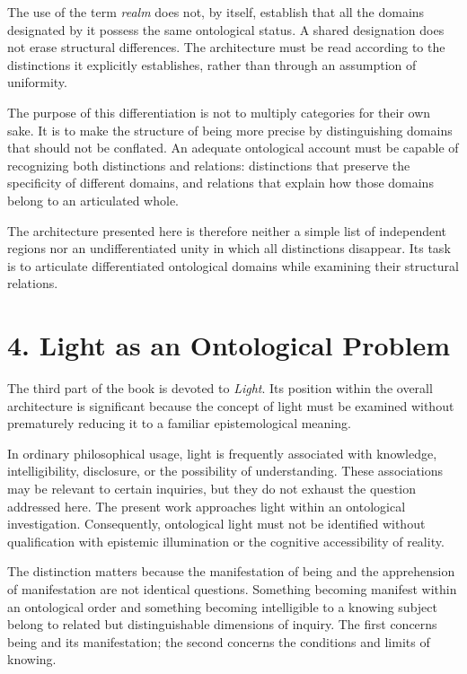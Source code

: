 The use of the term \textit{realm} does not, by itself,
establish that all the domains designated by it possess
the same ontological status. A shared designation does
not erase structural differences. The architecture must
be read according to the distinctions it explicitly
establishes, rather than through an assumption of uniformity.

The purpose of this differentiation is not to multiply
categories for their own sake. It is to make the structure
of being more precise by distinguishing domains that
should not be conflated. An adequate ontological account
must be capable of recognizing both distinctions and
relations: distinctions that preserve the specificity of
different domains, and relations that explain how those
domains belong to an articulated whole.

The architecture presented here is therefore neither a
simple list of independent regions nor an undifferentiated
unity in which all distinctions disappear. Its task is
to articulate differentiated ontological domains while
examining their structural relations.


\section*{4. Light as an Ontological Problem}

The third part of the book is devoted to \textit{Light}.
Its position within the overall architecture is significant
because the concept of light must be examined without
prematurely reducing it to a familiar epistemological meaning.

In ordinary philosophical usage, light is frequently
associated with knowledge, intelligibility, disclosure,
or the possibility of understanding. These associations
may be relevant to certain inquiries, but they do not
exhaust the question addressed here. The present work
approaches light within an ontological investigation.
Consequently, ontological light must not be identified
without qualification with epistemic illumination or
the cognitive accessibility of reality.

The distinction matters because the manifestation of
being and the apprehension of manifestation are not
identical questions. Something becoming manifest within
an ontological order and something becoming intelligible
to a knowing subject belong to related but distinguishable
dimensions of inquiry. The first concerns being and its
manifestation; the second concerns the conditions and
limits of knowing.

